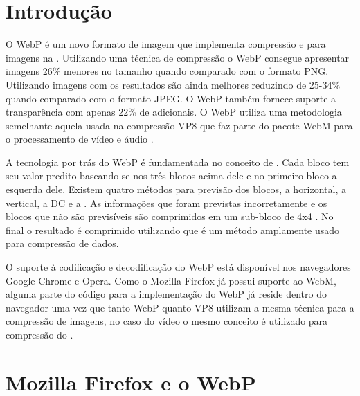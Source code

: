 \documentclass[espaco=simples,appendix=Name]{abnt}
\begin{document}
\begin{description}

\section{Introdução}

\item \noindent
O WebP é um novo formato de imagem que implementa compressão  e  para imagens na . Utilizando uma técnica de compressão  o WebP consegue apresentar imagens 26\% menores no tamanho quando comparado com o formato PNG. Utilizando imagens com  os resultados são ainda melhores reduzindo de 25-34\% quando comparado com o formato JPEG. O WebP também fornece suporte a transparência com apenas 22\% de  adicionais. O WebP utiliza uma metodologia semelhante aquela usada na compressão VP8 que faz parte do pacote WebM para o processamento de vídeo e áudio \cite{WebPLossyStudy}.

A tecnologia por trás do WebP é fundamentada no conceito de . Cada bloco tem seu valor predito baseando-se nos três blocos acima dele e no primeiro bloco a esquerda dele. Existem quatro métodos para previsão dos blocos, a horizontal, a vertical, a DC e a . As informações que foram previstas incorretamente e os blocos que não são previsíveis são comprimidos em um sub-bloco de 4x4 . No final o resultado é comprimido utilizando  que é um método  amplamente usado para compressão de dados.

O suporte à codificação e decodificação do WebP está disponível nos navegadores Google Chrome e Opera. Como o Mozilla Firefox já possui suporte ao WebM, alguma parte do código para a implementação do WebP já reside dentro do navegador uma vez que tanto WebP quanto VP8 utilizam a mesma técnica para a compressão de imagens, no caso do vídeo o mesmo conceito é utilizado para compressão do .

\section{Mozilla Firefox e o WebP}

\item \noindent


\end{description}
\end{document}
